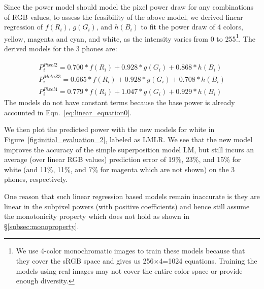 
Since the power model should model the pixel power draw for
any combinations of RGB values, to assess the feasibility of the above model, we 
derived linear regression of $f(R_{i})$, $g(G_{i})$, and $h(B_{i})$ 
to fit the power draw of 4 colors, yellow, magenta and cyan, and white,
as the intensity varies from 0 to 255\footnote{We use 4-color monochromatic images to train these
  models because that they cover the sRGB space and gives us 256$\times$4=1024 equations.
  Training the models using real images may not cover the entire color space or provide
  enough diversity.}. The derived models
for the 3 phones are:

\vspace{-0.1in}
{\small
  \begin{eqnarray}
	P_i^{Pixel 2} = 0.700*f(R_i) + 0.928*g(G_i) + 0.868*h(B_i) \\
	P_i^{Moto Z3} = 0.665*f(R_i) + 0.928*g(G_i) + 0.708*h(B_i) \\
	P_i^{Pixel 4} = 0.779*f(R_i) + 1.047*g(G_i) + 0.929*h(B_i)
	\label{eq:linear_model_linear_regression}
  \end{eqnarray}
}
\noindent
The models do not have constant terms because the base power is
already accounted in Eqn.~\ref{eq:linear_equation0}.

We then plot the predicted power with the new models for white in
Figure~\ref{fig:initial_evaluation_2}, labeled as LMLR.  We see that the new model
improves the accuracy of the simple superposition model LM, but still
incurs an average (over linear RGB values)
prediction error of 19\%, 23\%, and 15\% for white
(and 11\%, 11\%, and 7\% for magenta which are not shown) on the 3 phones, respectively.

One reason that such linear regression based models remain inaccurate
is they are linear in the subpixel powers (with positive coefficients) and hence still
assume the monotonicity property which does not hold as shown
in \S\ref{subsec:monoproperty}.

